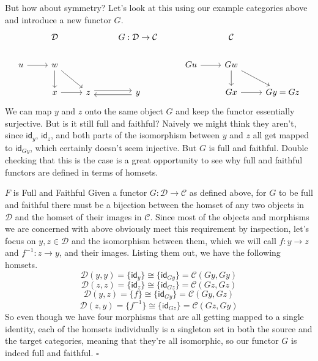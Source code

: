 \documentclass[12pt]{article}
\newcounter{examp}
\begin{document}
But how about symmetry?
Let's look at this using our example categories above and introduce a new functor $G$.
\[\begin{tikzcd}
    & {\mathcal{D}} && {G:\mathcal{D}\rightarrow\mathcal{C}} && {\mathcal{C}} \\
    u & w &&& Gu & Gw \\
    & x & z & y && Gx & {Gy=Gz}
    \arrow[from=2-1, to=2-2]
    \arrow[from=2-2, to=3-2]
    \arrow[from=3-2, to=3-3]
    \arrow[from=2-2, to=3-3]
    \arrow[from=2-5, to=2-6]
    \arrow[from=2-6, to=3-6]
    \arrow[from=2-6, to=3-7]
    \arrow[from=3-6, to=3-7]
    \arrow[shift left, from=3-3, to=3-4]
    \arrow[shift left, from=3-4, to=3-3]
  \end{tikzcd}\]
We can map $y$ and $z$ onto the same object $G$ and keep the functor essentially surjective.
But is it still full and faithful?
Naively we might think they aren't, since $\mathsf{id}_y$, $\mathsf{id}_z$, and both parts of the isomorphism between $y$ and $z$ all get mapped to $\mathsf{id}_{Gy}$, which certainly doesn't seem injective.
But $G$ is full and faithful.
Double checking that this is the case is a great opportunity to see why full and faithful functors are defined in terms of homsets.
\begin{proofbox}{$F$ is Full and Faithful}{}
  Given a functor $G: \mathcal{D} \rightarrow \mathcal{C}$ as defined above, for $G$ to be full and faithful there must be a bijection between the homset of any two objects in $\mathcal{D}$ and the homset of their images in $\mathcal{C}$.
  Since most of the objects and morphisms we are concerned with above obviously meet this requirement by inspection, let's focus on $y,z \in \mathcal{D}$ and the isomorphism between them, which we will call $f:y\rightarrow z$ and $f^{-1}:z\rightarrow y$, and their images.
  Listing them out, we have the following homsets.
  $$\mathcal{D}(y, y) = \{\mathsf{id}_y\} \cong \{\mathsf{id}_{Gy}\} = \mathcal{C}(Gy, Gy)$$
  $$\mathcal{D}(z, z) = \{\mathsf{id}_z\} \cong \{\mathsf{id}_{Gz}\} = \mathcal{C}(Gz, Gz)$$
  $$\mathcal{D}(y, z) = \{f\} \cong \{\mathsf{id}_{Gy}\} = \mathcal{C}(Gy, Gz)$$
  $$\mathcal{D}(z, y) = \{f^{-1}\} \cong \{\mathsf{id}_{Gz}\} = \mathcal{C}(Gz, Gy)$$
  So even though we have four morphisms that are all getting mapped to a single identity, each of the homsets individually is a singleton set in both the source and the target categories, meaning that they're all isomorphic, so our functor $G$ is indeed full and faithful. $\square$
\end{proofbox}
\end{document}
